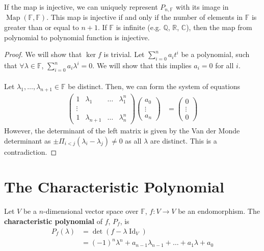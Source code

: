 \documentclass[letterpaper,12pt]{article}
\begin{document}
If the map is injective, we can uniquely represent $P_{n, \mathbb{F}}$ with its image in $\operatorname{Map}(\mathbb{F}, \mathbb{F})$. This map is injective if and only if the number of elements in $\mathbb{F}$ is greater than or equal to $n+1$. If $\mathbb{F}$ is infinite (e.g. $\mathbb{Q}$, $\mathbb{R}$, $\mathbb{C}$), then the map from polynomial to polynomial function is injective.

\begin{proof}
We will show that $\ker{f}$ is trivial. Let $\sum_{i=0}^n a_i t^i$ be a polynomial, such that $\forall \lambda \in \mathbb{F}$, $\sum_{i=0}^n a_i \lambda^i = 0$. We will show that this implies $a_i = 0$ for all $i$.
\\ \\ Let $\lambda_1, \dots, \lambda_{n+1} \in \mathbb{F}$ be distinct. Then, we can form the system of equations
\begin{align*}
    \begin{pmatrix}
    1 & \lambda_1 & \dots & \lambda_1^n \\
    \vdots & & & \\
    1 & \lambda_{n+1} & \dots & \lambda_n^n 
    \end{pmatrix}
    \begin{pmatrix}
    a_0 \\ \vdots \\ a_n
    \end{pmatrix}
    & = \begin{pmatrix} 0 \\ \vdots \\ 0 \end{pmatrix}
\end{align*}
However, the determinant of the left matrix is given by the Van der Monde determinant as $\pm \Pi_{i<j} (\lambda_i - \lambda_j) \neq 0$ as all $\lambda$ are distinct. This is a contradiction.
\end{proof}

\section*{The Characteristic Polynomial}
\begin{definition}
Let $V$ be a $n$-dimensional vector space over $\mathbb{F}$, $f: V \rightarrow V$ be an endomorphism. The \textbf{characteristic polynomial} of $f$, $P_{f}$, is
\begin{align*}
    P_{f}(\lambda) & = \det{(f - \lambda \operatorname{Id}_{V})} \\
    & = (-1)^n \lambda^n + a_{n-1} \lambda_{n-1} + \dots + a_1 \lambda + a_0
\end{align*}
\end{definition}
\end{document}
